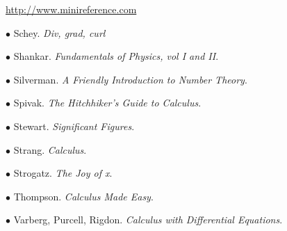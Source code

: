 \documentclass[11pt, oneside]{article}   	%
\begin{document}
\url{http://www.minireference.com}

$\bullet$ Schey.  \emph{Div, grad, curl}

$\bullet$ Shankar.  \emph{Fundamentals of Physics, vol I and II}.

$\bullet$ Silverman.  \emph{A Friendly Introduction to Number Theory}.

$\bullet$ Spivak.  \emph{The Hitchhiker's Guide to Calculus}.

$\bullet$ Stewart.  \emph{Significant Figures}.

$\bullet$ Strang.  \emph{Calculus}.

$\bullet$ Strogatz.  \emph{The Joy of x}.

$\bullet$ Thompson.  \emph{Calculus Made Easy}.

$\bullet$ Varberg, Purcell, Rigdon.  \emph{Calculus with Differential Equations}.
\end{document}

